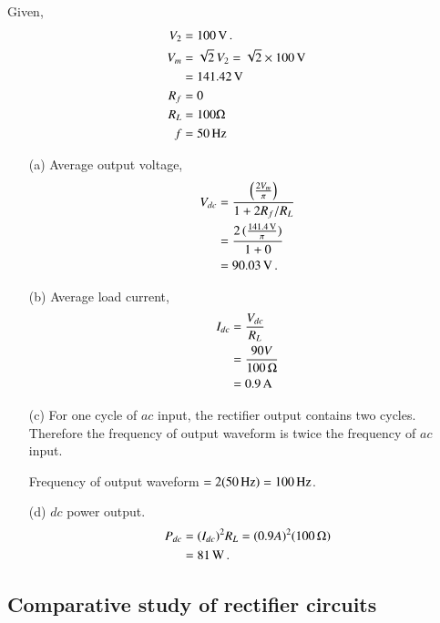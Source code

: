 \begin{solution}
Given,
\begin{align*}
V_2 & = 100 \operatorname{\mathrm{V}}.\\
V_m & = \sqrt{2}\, V_2=\sqrt{2}\times 100\text{\,V}\\
& = 141.42 \operatorname{\mathrm{V}}\\
R_f & = 0\\
R_L & = 100 \Omega\\
f & = 50 \operatorname{Hz}
\end{align*}

\begin{itemize}
\item[(a)] Average output voltage, 
\begin{align*}
V_{dc} & = \frac{\left(\frac{2 V_m}{\pi} \right)}{1 +2 R_f / R_L}
\\
& = \frac{2\,(\frac{141.4 \operatorname{\mathrm{V}}}{\pi})}{1+0}\\
& = 90.03 \operatorname{\mathrm{V}}.
\end{align*}

\item[(b)] Average load current,
\begin{align*}
I_{dc} & = \frac{V_{dc}}{R_L}\\
& = \frac{90 V}{100\, \Omega} \\
& = 0.9\text{\,A}
\end{align*}

\item[(c)] For one cycle of $ac$ input, the rectifier output contains
  two cycles. Therefore the frequency of output waveform is twice the
  frequency of $ac$ input.

Frequency of output waveform $=2(50\operatorname{Hz}) = 100 \operatorname{Hz}$.

\item[(d)] $dc$ power output.
\begin{align*}
P_{dc} & = (I_{dc})^2 R_L = (0.9 A)^2 (100\, \Omega)\\
& = 81 \operatorname{W}.
\end{align*}
\end{itemize}

\subsection{Comparative study of rectifier circuits}\label{sec2.17.1}


\end{solution}
